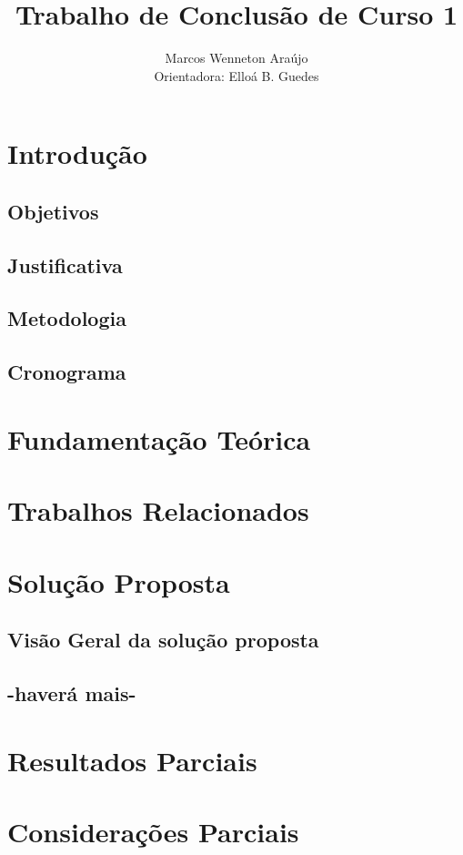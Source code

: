 \documentclass[12pt]{article}
\title{Trabalho de Conclusão de Curso 1}
\author{Marcos Wenneton Araújo\\
Orientadora: Elloá B. Guedes}
\begin{document}
\maketitle
\pagestyle{plain} %

\section{Introdução} \label{sec:introducao}

\subsection{Objetivos}

\subsection{Justificativa}

\subsection{Metodologia}

\subsection{Cronograma}

\section{Fundamentação Teórica} \label{sec:fund-teor}



\section{Trabalhos Relacionados} \label{sec:trab-rel}



\section{Solução Proposta} \label{sec:sol-prop}

\subsection{Visão Geral da solução proposta}

\subsection{-haverá mais-}

\section{Resultados Parciais} \label{sec:res-parc}


\section{Considerações Parciais} \label{sec:cons-parc}






\end{document}
